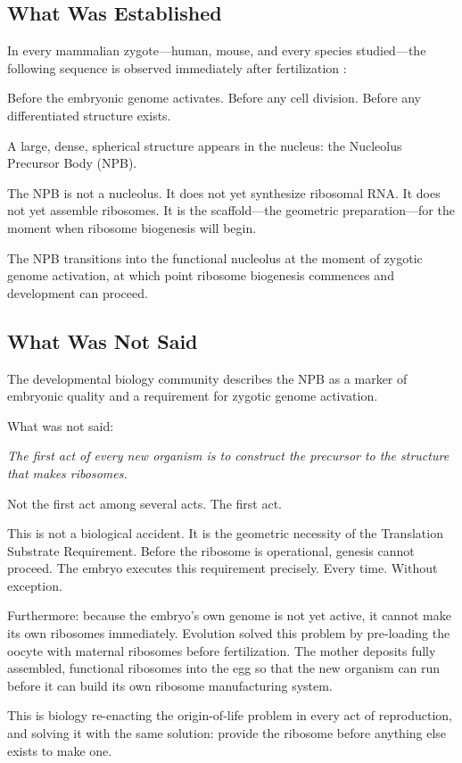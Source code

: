 \documentclass[11pt]{article}
\theoremstyle{definition}
\begin{document}
\subsection{What Was Established}

In every mammalian zygote---human, mouse, and every species
studied---the following sequence is observed immediately after
fertilization \cite{Fulka2019}:

Before the embryonic genome activates.
Before any cell division.
Before any differentiated structure exists.

A large, dense, spherical structure appears in the nucleus:
the Nucleolus Precursor Body (NPB).

The NPB is not a nucleolus.
It does not yet synthesize ribosomal RNA.
It does not yet assemble ribosomes.
It is the scaffold---the geometric preparation---for the moment
when ribosome biogenesis will begin.

The NPB transitions into the functional nucleolus at the moment of
zygotic genome activation, at which point ribosome biogenesis
commences and development can proceed.

\subsection{What Was Not Said}

The developmental biology community describes the NPB as a marker
of embryonic quality and a requirement for zygotic genome activation.

What was not said:

\emph{The first act of every new organism is to construct the
precursor to the structure that makes ribosomes.}

Not the first act among several acts.
The first act.

This is not a biological accident.
It is the geometric necessity of the Translation Substrate
Requirement.
Before the ribosome is operational, genesis cannot proceed.
The embryo executes this requirement precisely.
Every time.
Without exception.

Furthermore: because the embryo's own genome is not yet active,
it cannot make its own ribosomes immediately.
Evolution solved this problem by pre-loading the oocyte with
maternal ribosomes before fertilization.
The mother deposits fully assembled, functional ribosomes into
the egg so that the new organism can run before it can build
its own ribosome manufacturing system.

This is biology re-enacting the origin-of-life problem in every
act of reproduction, and solving it with the same solution:
provide the ribosome before anything else exists to make one.
\end{document}
